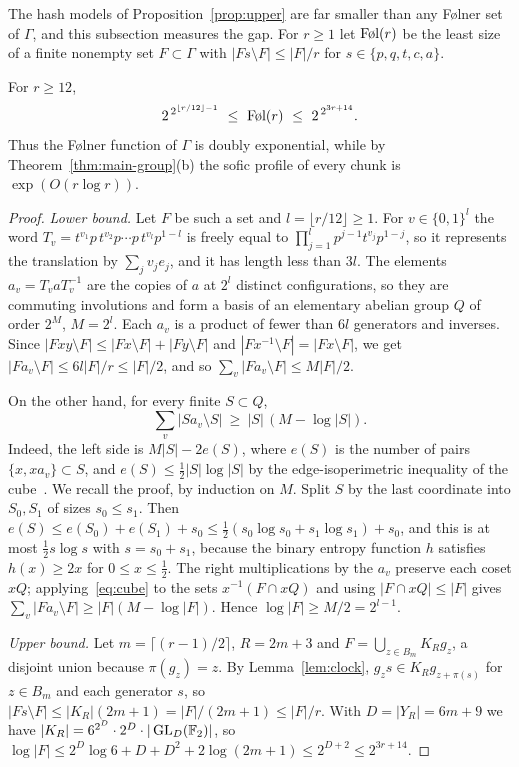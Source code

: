 The hash models of Proposition~\ref{prop:upper} are far smaller than any F\o lner set of $\Gamma$, and this subsection measures the gap. For
$r\ge1$ let $\textup{Føl}(r)$ be the least size of a finite nonempty set $F\subset\Gamma$ with $|Fs\setminus F|\le|F|/r$ for
$s\in\{p,q,t,c,a\}$.

\begin{proposition}\label{prop:folner-lower}
For $r\ge12$,
\[
2^{\,2^{\lfloor r/12\rfloor-1}}\ \le\ \textup{Føl}(r)\ \le\ 2^{\,2^{3r+14}} .
\]
Thus the Følner function of $\Gamma$ is doubly exponential, while by Theorem~\ref{thm:main-group}(b) the sofic profile of every chunk is
$\exp(O(r\log r))$.
\end{proposition}

\begin{proof}
\emph{Lower bound.} Let $F$ be such a set and $l=\lfloor r/12\rfloor\ge1$. For $v\in\{0,1\}^l$ the word
$T_v=t^{v_1}p\,t^{v_2}p\cdots p\,t^{v_l}p^{1-l}$ is freely equal to $\prod_{j=1}^lp^{j-1}t^{v_j}p^{1-j}$, so it represents the translation by
$\sum_jv_je_j$, and it has length less than $3l$. The elements $a_v=T_vaT_v^{-1}$ are the copies of $a$ at $2^l$ distinct configurations, so they
are commuting involutions and form a basis of an elementary abelian group $Q$ of order $2^{M}$, $M=2^l$. Each $a_v$ is a product of fewer than
$6l$ generators and inverses. Since $|Fxy\setminus F|\le|Fx\setminus F|+|Fy\setminus F|$ and $|Fx^{-1}\setminus F|=|Fx\setminus F|$, we get
$|Fa_v\setminus F|\le6l|F|/r\le|F|/2$, and so $\sum_v|Fa_v\setminus F|\le M|F|/2$.

On the other hand, for every finite $S\subset Q$,
\begin{equation}\label{eq:cube}
\sum_v|Sa_v\setminus S|\ \ge\ |S|\,(M-\log|S|).
\end{equation}
Indeed, the left side is $M|S|-2e(S)$, where $e(S)$ is the number of pairs $\{x,xa_v\}\subset S$, and $e(S)\le\frac12|S|\log|S|$ by the
edge-isoperimetric inequality of the cube~\cite{Harper1964}. We recall the proof, by induction on $M$. Split $S$ by the last coordinate into
$S_0,S_1$ of sizes $s_0\le s_1$. Then $e(S)\le e(S_0)+e(S_1)+s_0\le\frac12(s_0\log s_0+s_1\log s_1)+s_0$, and this is at most $\frac12s\log s$ with
$s=s_0+s_1$, because the binary entropy function $h$ satisfies $h(x)\ge2x$ for $0\le x\le\frac12$. The right multiplications by the $a_v$ preserve
each coset $xQ$; applying~\eqref{eq:cube} to the sets $x^{-1}(F\cap xQ)$ and using $|F\cap xQ|\le|F|$ gives
$\sum_v|Fa_v\setminus F|\ge|F|(M-\log|F|)$. Hence $\log|F|\ge M/2=2^{l-1}$.

\emph{Upper bound.} Let $m=\lceil(r-1)/2\rceil$, $R=2m+3$ and $F=\bigcup_{z\in B_m}K_Rg_z$, a disjoint union because $\pi(g_z)=z$. By
Lemma~\ref{lem:clock}, $g_zs\in K_Rg_{z+\pi(s)}$ for $z\in B_m$ and each generator $s$, so $|Fs\setminus F|\le|K_R|(2m+1)=|F|/(2m+1)\le|F|/r$. With
$D=|Y_R|=6m+9$ we have $|K_R|=6^{2^D}\cdot2^D\cdot|\operatorname{GL}_D(\mathbb F_2)|$, so $\log|F|\le2^D\log6+D+D^2+2\log(2m+1)\le2^{D+2}\le2^{3r+14}$.
\end{proof}

